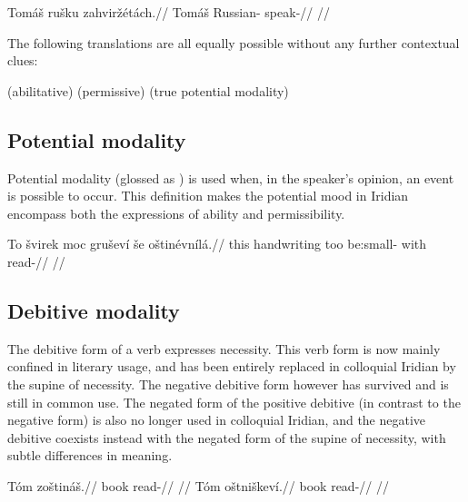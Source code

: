 \pex
\begingl
\gla Tomáš rušku zahviržétách.//
\glb Tomáš Russian- speak-//
\glft {}//
\endgl
\xe

The following translations are all equally possible without any further contextual clues:

\pex
\a {} (abilitative)
\a {} (permissive)
\a {} (true potential modality)
\xe

\subsection{Potential modality}

Potential modality (glossed as ) is used when, in the speaker's opinion, an event is possible to occur. This definition makes the potential mood in Iridian encompass both the expressions of ability and permissibility.

\pex
\begingl
\gla To švirek moc gruševí še oštinévnílá.//
\glb this handwriting too be:small- with read-//
\glft {}//
\endgl
\xe

\subsection{Debitive modality}

The debitive form of a verb expresses necessity. This verb form is now mainly confined in literary usage, and has been entirely replaced in colloquial Iridian by the supine of necessity. The negative debitive form however has survived and is still in common use. The negated form of the positive debitive (in contrast to the negative form) is also no longer used in colloquial Iridian, and the negative debitive coexists instead with the negated form of the supine of necessity, with subtle differences in meaning.

\begin{multicols}{2}
  \pex
  \a
  \begingl
  \gla Tóm zoštináš.//
  \glb book read-//
  \glft {}//
  \endgl
  \a \begingl
  \gla Tóm oštniškeví.//
  \glb book read-//
  \glft {}//
  \endgl
  \xe
\end{multicols}

